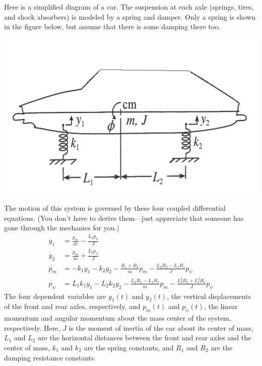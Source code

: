 \documentclass[12pt,letterpaper]{hmcpset}
\newcommand{\ind}{\leavevmode{\parindent=1em\indent}}
\begin{document}
\begin{problem}[5]
    Here is a simplified diagram of a car. The suspension at each axle
    (springs, tires, and shock absorbers) is modeled by a spring and
    damper. Only a spring is shown in the figure below, but assume
    that there is some damping there too.
    \begin{center}
        \includegraphics[scale=0.2]{img/may_26_5}
    \end{center}
    \ind The motion of this system is governed by these four coupled
    differential equations. (You don't have to derive them---just
    appreciate that someone has gone through the mechanics for you.)
    \begin{align*}
        \dot{y_1}&=\frac{p_m}{m}-\frac{L_1p_\psi}{J} \\
        \dot{y_2}&=\frac{p_m}{m}+\frac{L_2p_\psi}{J} \\
        \dot{p_m}&=-k_1y_1-k_2y_2-\frac{R_1+R_2}{m}p_m
        -\frac{L_2R_2-L_1R_1}{J}p_{\psi} \\
        \dot{p_\psi}&=L_1k_1y_1-L_2k_2y_2-\frac{L_2R_2-L_1R_1}{m}p_m
        -\frac{L_2^2R_2+L_1^2R_1}{J}p_{\psi}
    \end{align*}
    The four dependent variables are $y_1(t)$ and $y_2(t)$, the
    vertical displacements of the front and rear axles, respectively,
    and $p_m(t)$ and $p_{\psi}(t)$, the linear momentum and angular
    momentum about the mass center of the system, respectively. Here,
    $J$ is the moment of inertia of the car about its center of mass,
    $L_1$ and $L_2$ are the horizontal distances between the front and
    rear axles and the center of mass, $k_1$ and $k_2$ are the spring
    constants, and $R_1$ and $R_2$ are the damping resistance
    constants.\\\\

\end{problem}
\end{document}
